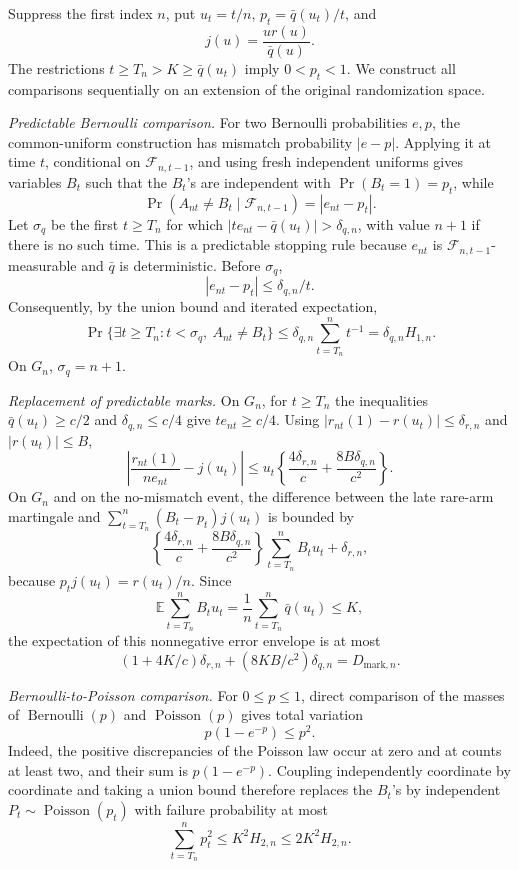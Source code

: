 Suppress the first index \(n\), put \(u_t=t/n\), \(p_t=\bar q(u_t)/t\), and
\[
 j(u)=\frac{u r(u)}{\bar q(u)}.
\]
The restrictions \(t\geq T_n>K\geq\bar q(u_t)\) imply \(0<p_t<1\).
We construct all comparisons sequentially on an extension of the original randomization space.

\emph{Predictable Bernoulli comparison.}
For two Bernoulli probabilities \(e,p\), the common-uniform construction has mismatch probability \(|e-p|\).  Applying it at time \(t\), conditional on \(\mathcal F_{n,t-1}\), and using fresh independent uniforms gives variables \(B_t\) such that the \(B_t\)'s are independent with
\(\Pr(B_t=1)=p_t\), while
\[
 \Pr(A_{nt}\ne B_t\mid\mathcal F_{n,t-1})=|e_{nt}-p_t|.
\]
Let \(\sigma_q\) be the first \(t\geq T_n\) for which
\(|t e_{nt}-\bar q(u_t)|>\delta_{q,n}\), with value \(n+1\) if there is no such time.  This is a predictable stopping rule because \(e_{nt}\) is \(\mathcal F_{n,t-1}\)-measurable and \(\bar q\) is deterministic.  Before \(\sigma_q\),
\[
 |e_{nt}-p_t|\leq\delta_{q,n}/t.
\]
Consequently, by the union bound and iterated expectation,
\[
 \Pr\{\exists t\geq T_n:t<\sigma_q,\ A_{nt}\ne B_t\}
 \leq\delta_{q,n}\sum_{t=T_n}^n t^{-1}
 =\delta_{q,n}H_{1,n}.
\]
On \(G_n\), \(\sigma_q=n+1\).

\emph{Replacement of predictable marks.}
On \(G_n\), for \(t\geq T_n\) the inequalities
\(\bar q(u_t)\geq c/2\) and
\(\delta_{q,n}\leq c/4\) give \(t e_{nt}\geq c/4\).
Using \(|r_{nt}(1)-r(u_t)|\leq\delta_{r,n}\) and
\(|r(u_t)|\leq B\),
\[
 \left|\frac{r_{nt}(1)}{n e_{nt}}-j(u_t)\right|
 \leq u_t\left\{\frac{4\delta_{r,n}}{c}
              +\frac{8B\delta_{q,n}}{c^2}\right\}.
\]
On \(G_n\) and on the no-mismatch event, the difference between the late rare-arm martingale and
\(\sum_{t=T_n}^n(B_t-p_t)j(u_t)\) is bounded by
\[
 \left\{\frac{4\delta_{r,n}}{c}
              +\frac{8B\delta_{q,n}}{c^2}\right\}
       \sum_{t=T_n}^nB_tu_t+\delta_{r,n},
\]
because \(p_tj(u_t)=r(u_t)/n\).  Since
\[
 \mathbb E\sum_{t=T_n}^n B_tu_t
 =\frac1n\sum_{t=T_n}^n\bar q(u_t)\leq K,
\]
the expectation of this nonnegative error envelope is at most
\[
 (1+4K/c)\delta_{r,n}+(8KB/c^2)\delta_{q,n}
 =D_{\mathrm{mark},n}.
\]

\emph{Bernoulli-to-Poisson comparison.}
For \(0\leq p\leq1\), direct comparison of the masses of
\(\operatorname{Bernoulli}(p)\) and \(\operatorname{Poisson}(p)\) gives total variation
\[
 p(1-e^{-p})\leq p^2.
\]
Indeed, the positive discrepancies of the Poisson law occur at zero and at counts at least two, and their sum is \(p(1-e^{-p})\).  Coupling independently coordinate by coordinate and taking a union bound therefore replaces the \(B_t\)'s by independent \(P_t\sim\operatorname{Poisson}(p_t)\) with failure probability at most
\[
 \sum_{t=T_n}^n p_t^2\leq K^2H_{2,n}\leq2K^2H_{2,n}.
\]

